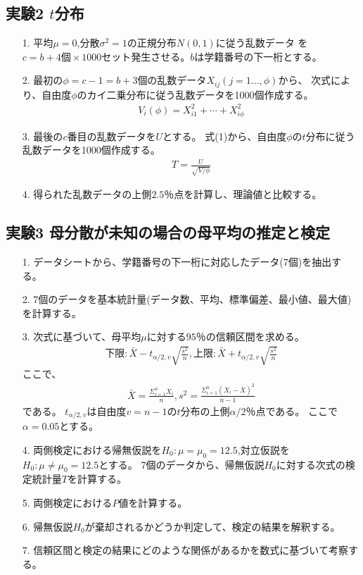 \documentclass[12pt]{jarticle}
\begin{document}
\subsection{実験2 $t$分布}
\begin{itemize}
    \item [1.]平均$\mu=0$,分散$\sigma^2=1$の正規分布$N(0,1)$に従う乱数データ
          を$c=b+4個\times 1000セット$発生させる。$b$は学籍番号の下一桁とする。
    \item [2.]最初の$\phi=c-1=b+3$個の乱数データ$X_{ij}(j=1...,\phi)$から、
          次式により、自由度$\phi$のカイ二乗分布に従う乱数データを1000個作成する。
          \begin{eqnarray}
              V_i(\phi)=X_{i1}^2+\cdots+X_{i\phi}^2\nonumber
          \end{eqnarray}
    \item [3.]最後の$c$番目の乱数データを$U$とする。
          式(1)から、自由度$\phi$の$t$分布に従う乱数データを1000個作成する。
          \begin{eqnarray}
              T=\frac{U}{\sqrt{V/\phi}}
          \end{eqnarray}
    \item [4.]得られた乱数データの上側$2.5％$点を計算し、理論値と比較する。
\end{itemize}
\subsection{実験3 母分散が未知の場合の母平均の推定と検定}
\begin{itemize}
    \item [1.]データシートから、学籍番号の下一桁に対応したデータ(7個)を抽出する。
    \item [2.]7個のデータを基本統計量(データ数、平均、標準偏差、最小値、最大値)を計算する。
    \item [3.]次式に基づいて、母平均$\mu$に対する$95％$の信頼区間を求める。
          \begin{eqnarray}
              下限:\bar{X}-t_{\alpha/2,v}\sqrt{\frac{s^2}{n}},　上限:\bar{X}+t_{\alpha/2,v}\sqrt{\frac{s^2}{n}}\nonumber
          \end{eqnarray}
          ここで、
          \begin{eqnarray}
              \bar{X}=\frac{\Sigma^{n}_{i=1}X_{i}}{n},　s^2=\frac{\Sigma^{n}_{i=1}{(X_{i}-\bar{X})}^2}{n-1} \nonumber
          \end{eqnarray}
          である。
          $t_{\alpha/2,v}$は自由度$v=n-1$の$t$分布の上側$\alpha/2％$点である。
          ここで$\alpha=0.05$とする。
    \item [4.]両側検定における帰無仮説を$H_0:\mu=\mu_0=12.5$,対立仮説を$H_0:\mu\neq\mu_0=12.5$とする。
          7個のデータから、帰無仮説$H_0$に対する次式の検定統計量$T$を計算する。
    \item [5.]両側検定における$P値$を計算する。
    \item [6.]帰無仮説$H_0$が棄却されるかどうか判定して、検定の結果を解釈する。
    \item [7.]信頼区間と検定の結果にどのような関係があるかを数式に基づいて考察する。
\end{itemize}
\end{document}

